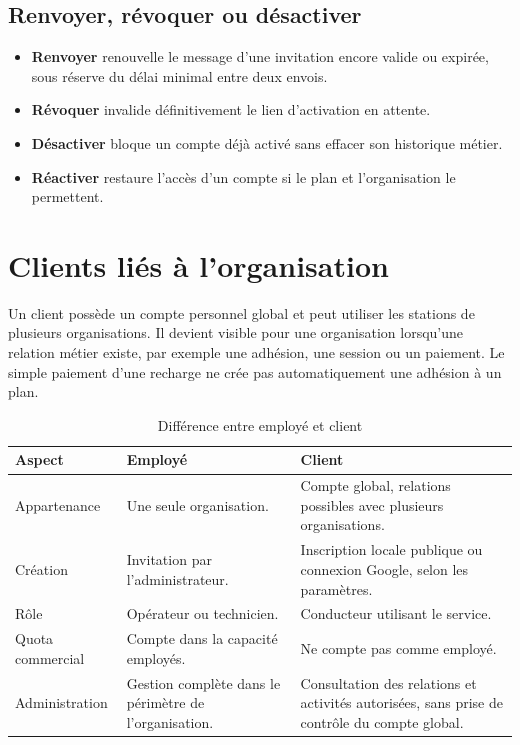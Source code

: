 
\subsection{Renvoyer, révoquer ou désactiver}

\begin{itemize}[leftmargin=*]
  \item \textbf{Renvoyer} renouvelle le message d'une invitation encore valide
  ou expirée, sous réserve du délai minimal entre deux envois.
  \item \textbf{Révoquer} invalide définitivement le lien d'activation en
  attente.
  \item \textbf{Désactiver} bloque un compte déjà activé sans effacer son
  historique métier.
  \item \textbf{Réactiver} restaure l'accès d'un compte si le plan et
  l'organisation le permettent.
\end{itemize}


\section{Clients liés à l'organisation}

Un client possède un compte personnel global et peut utiliser les stations de
plusieurs organisations. Il devient visible pour une organisation lorsqu'une
relation métier existe, par exemple une adhésion, une session ou un paiement.
Le simple paiement d'une recharge ne crée pas automatiquement une adhésion à
un plan.

\begin{table}[H]
  \centering
  \caption{Différence entre employé et client}
  \label{tab:employee-customer}
  \small
  \renewcommand{\arraystretch}{1.08}
  \begin{tabularx}{\textwidth}{|L{3.2cm}|Y|Y|}
    \hline
    \textbf{Aspect} & \textbf{Employé} & \textbf{Client} \\ \hline
    Appartenance & Une seule organisation. & Compte global, relations possibles
    avec plusieurs organisations. \\ \hline
    Création & Invitation par l'administrateur. & Inscription locale publique ou
    connexion Google, selon les paramètres. \\ \hline
    Rôle & Opérateur ou technicien. & Conducteur utilisant le service. \\ \hline
    Quota commercial & Compte dans la capacité employés. & Ne compte pas comme
    employé. \\ \hline
    Administration & Gestion complète dans le périmètre de l'organisation. &
    Consultation des relations et activités autorisées, sans prise de contrôle
    du compte global. \\ \hline
  \end{tabularx}
\end{table}

